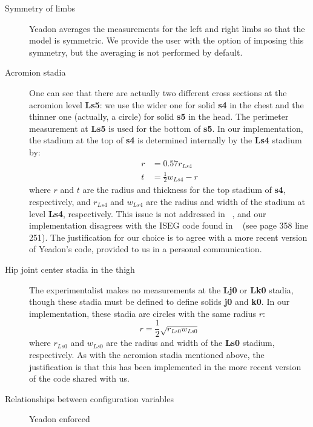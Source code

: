 \documentclass[10pt,a4paper,twocolumn]{article}
\begin{document}
\begin{description}
    \item[Symmetry of limbs] Yeadon averages the measurements for the left and
        right limbs so that the model is symmetric. We provide the user with
        the option of imposing this symmetry, but the
        averaging is not performed by default.
    \item[Acromion stadia] One can see that there are actually two different
        cross sections at the acromion level \textbf{Ls5}: we use the wider one
        for solid \textbf{s4} in the chest and the thinner one (actually, a
        circle) for solid \textbf{s5} in the head. The perimeter measurement at
        \textbf{Ls5} is used for the bottom of \textbf{s5}. In our
        implementation, the stadium at the top of \textbf{s4} is
        determined internally by the \textbf{Ls4} stadium by:
        \begin{align}
            r &= 0.57 r_{Ls4} \\
            t &= \frac{1}{2}w_{Ls4} - r
        \end{align}
        where $r$ and $t$ are the radius and thickness for the top stadium of
        \textbf{s4}, respectively, and $r_{Ls4}$ and $w_{Ls4}$ are the radius
        and width of the stadium at level \textbf{Ls4}, respectively.
        This issue is not addressed in ~\cite{Yeadon1990c, Yeadon1990f,
Yeadon1990e, Yeadon1990d}, and our
        implementation disagrees with the ISEG code found in ~\cite{Yeadon1984a} (see page 358 line 251). The
        justification for our choice is to agree with a more recent version of Yeadon's
        code, provided to us in a personal communication.
    \item[Hip joint center stadia in the thigh] The experimentalist makes no
        measurements at the \textbf{Lj0} or \textbf{Lk0} stadia, though these
        stadia must be defined to define solids \textbf{j0} and \textbf{k0}. In
        our implementation, these stadia are circles with the same radius $r$:
        \begin{equation}
            r = \frac{1}{2}\sqrt{r_{Ls0} w_{Ls0}}
        \end{equation}
        where $r_{Ls0}$ and $w_{Ls0}$ are the radius and width of the
        \textbf{Ls0} stadium, respectively. As with the acromion stadia 
        mentioned above, the justification is that this has been implemented in the
        more recent version of the code shared with us.
    \item[Relationships between configuration variables] Yeadon enforced

\end{description}
\end{document}
